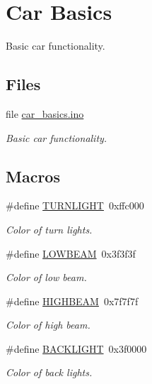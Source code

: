 \hypertarget{group__car}{}\section{Car Basics}
\label{group__car}


Basic car functionality.  


\subsection*{Files}
\begin{DoxyCompactItemize}
\item 
file \hyperlink{car__basics_8ino}{car\+\_\+basics.\+ino}
\begin{DoxyCompactList}\small\item\em Basic car functionality. \end{DoxyCompactList}\end{DoxyCompactItemize}
\subsection*{Macros}
\begin{DoxyCompactItemize}
\item 
\#define \hyperlink{group__car_ga6670c8646da7675376960bb5773199fd}{T\+U\+R\+N\+L\+I\+G\+HT}~0xffc000
\begin{DoxyCompactList}\small\item\em Color of turn lights. \end{DoxyCompactList}\item 
\#define \hyperlink{group__car_ga61bb8d5dab460079c1b621b2d8a4bd9c}{L\+O\+W\+B\+E\+AM}~0x3f3f3f
\begin{DoxyCompactList}\small\item\em Color of low beam. \end{DoxyCompactList}\item 
\#define \hyperlink{group__car_ga3f561f12573270e4b5329bc5930ad20f}{H\+I\+G\+H\+B\+E\+AM}~0x7f7f7f
\begin{DoxyCompactList}\small\item\em Color of high beam. \end{DoxyCompactList}\item 
\#define \hyperlink{group__car_gae97ccf06dd29b2a0500f378068b678e2}{B\+A\+C\+K\+L\+I\+G\+HT}~0x3f0000
\begin{DoxyCompactList}\small\item\em Color of back lights. \end{DoxyCompactList}\end{DoxyCompactItemize}
